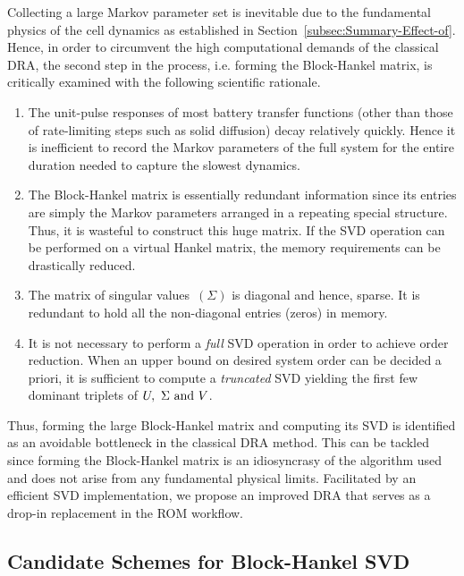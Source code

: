 Collecting a large Markov parameter set is inevitable due to the fundamental
physics of the cell dynamics as established in Section~\ref{subsec:Summary-Effect-of}.
Hence, in order to circumvent the high computational demands of the
classical DRA, the second step in the process, i.e. forming the Block-Hankel
matrix, is critically examined with the following scientific rationale.
\begin{enumerate}
	\item The unit-pulse responses of most battery transfer functions (other
	than those of rate-limiting steps such as solid diffusion) decay relatively
	quickly. Hence it is inefficient to record the Markov parameters of
	the full system for the entire duration needed to capture the slowest
	dynamics.
	\item The Block-Hankel matrix is essentially redundant information since
	its entries are simply the Markov parameters arranged in a repeating
	special structure. Thus, it is wasteful to construct this huge matrix.
	If the SVD operation can be performed on a virtual Hankel matrix,
	the memory requirements can be drastically reduced.
	\item The matrix of singular values~$\left(\Sigma\right)$ is diagonal
	and hence, sparse. It is redundant to hold all the non-diagonal entries
	(zeros) in memory.
	\item It is not necessary to perform a \textit{full} SVD operation in order
	to achieve order reduction. When an upper bound on desired system
	order can be decided a priori, it is sufficient to compute a \textit{truncated}
	SVD yielding the first few dominant triplets of $U,\text{ \ensuremath{\Sigma}\ \text{and }}V$.
\end{enumerate}
Thus, forming the large Block-Hankel matrix and computing its SVD
is identified as an avoidable bottleneck in the classical DRA method.
This can be tackled since forming the Block-Hankel matrix is an idiosyncrasy
of the algorithm used and does not arise from any fundamental physical
limits. Facilitated by an efficient SVD implementation, we propose
an improved DRA that serves as a drop-in replacement in the ROM workflow.

\subsection{Candidate Schemes for Block-Hankel SVD}

\begin{figure*}
	\caption{}
	\label{improved_ROM_workflow}
\end{figure*}

